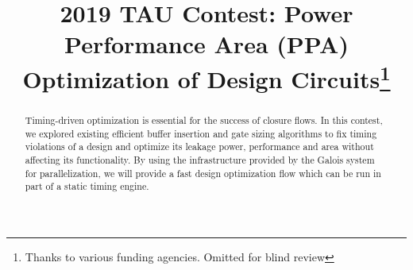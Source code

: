 \documentclass[conference]{IEEEtran}
\begin{document}
\title{2019 TAU Contest: Power Performance Area (PPA) Optimization of Design
  Circuits\thanks{Thanks to various funding agencies. Omitted for blind review}
}

\author{
\and
{}
\and
{}
}
\maketitle

\begin{abstract}
Timing-driven optimization is essential for the success of closure flows. In this contest, we explored existing efficient buffer insertion and gate sizing algorithms to fix timing violations of a design and optimize its leakage power, performance and area without affecting its functionality. By using the infrastructure provided by the Galois system for parallelization, we will provide a fast design optimization flow which can be run in part of a static timing engine.
\end{abstract}







\end{document}
